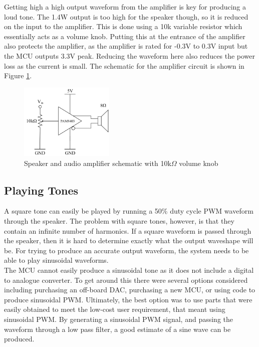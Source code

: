 \documentclass[12pt, a4paper]{article}
\begin{document}
Getting high a high output waveform from the amplifier is key for producing a loud tone. The 1.4W output is too high for the speaker though, so it is reduced on the input to the amplifier. This is done using a 10k variable resistor which essentially acts as a volume knob. Putting this at the entrance of the amplifier also protects the amplifier, as the amplifier is rated for -0.3V to 0.3V input but the MCU outputs 3.3V peak. Reducing the waveform here also reduces the power loss as the current is small. The schematic for the amplifier circuit is shown in Figure \ref{fig:L_amplifier}.
\begin{figure} [!htb]
	\captionsetup{justification=centering}
	\hfill\includegraphics[width=0.4\textwidth]{./images/speaker/L_Amplifier}\hspace{\fill}
	\caption{Speaker and audio amplifier schematic with 10k$\Omega$ volume knob}
	\label{fig:L_amplifier}
\end{figure}
\subsection{Playing Tones}
A square tone can easily be played by running a 50\% duty cycle PWM waveform through the speaker. The problem with square tones, however, is that they contain an infinite number of harmonics. If a square waveform is passed through the speaker, then it is hard to determine exactly what the output waveshape will be. For trying to produce an accurate output waveform, the system needs to be able to play sinusoidal waveforms. \\

The MCU cannot easily produce a sinusoidal tone as it does not include a digital to analogue converter. To get around this there were several options considered including purchasing an off-board DAC, purchasing a new MCU, or using code to produce sinusoidal PWM. Ultimately, the best option was to use parts that were easily obtained to meet the low-cost user requirement, that meant using sinusoidal PWM. By generating a sinusoidal PWM signal, and passing the waveform through a low pass filter, a good estimate of a sine wave can be produced. \\
\end{document}
